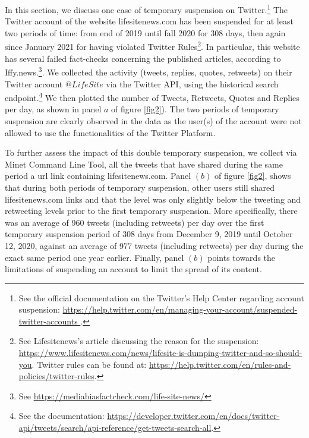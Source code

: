\documentclass[11pt,a4paper]{article}
\begin{document}
In this section, we discuss one case of temporary suspension on Twitter.\footnote{See the official documentation on the Twitter's Help Center regarding account suspension: \href{https://help.twitter.com/en/managing-your-account/suspended-twitter-accounts}{https://help.twitter.com/en/managing-your-account/suspended-twitter-accounts }.} The Twitter account of the website lifesitenews.com has been suspended for at least two periods of time: from end of 2019 until fall 2020 for 308 days, then again since January 2021 for having violated Twitter Rules\footnote{See Lifesitenews's article discussing the reason for the suspension: \href{https://www.lifesitenews.com/news/lifesite-is-dumping-twitter-and-so-should-you}{https://www.lifesitenews.com/news/lifesite-is-dumping-twitter-and-so-should-you}. Twitter rules can be found at: \href{https://help.twitter.com/en/rules-and-policies/twitter-rules}{https://help.twitter.com/en/rules-and-policies/twitter-rules}. }. In particular, this website has several failed fact-checks concerning the published articles, according to Iffy.news.\footnote{See \href{https://mediabiasfactcheck.com/life-site-news/}{https://mediabiasfactcheck.com/life-site-news/}}. We collected the activity (tweets, replies, quotes, retweets) on their Twitter account $@LifeSite$ via the Twitter API, using the historical search endpoint.\footnote{See the documentation: \href{https://developer.twitter.com/en/docs/twitter-api/tweets/search/api-reference/get-tweets-search-all}{https://developer.twitter.com/en/docs/twitter-api/tweets/search/api-reference/get-tweets-search-all}.} We then plotted the number of Tweets, Retweets, Quotes and Replies per day, as shown in panel $a$ of figure \ref{fig2}). The two periods of temporary suspension are clearly observed in the data as the user(s) of the account were not allowed to use the functionalities of the Twitter Platform. 

\smallskip

To further assess the impact of this double temporary suspension, we collect via Minet Command Line Tool\cite{minet}, all the tweets that have shared during the same period a url link containing lifesitenews.com. Panel $(b)$ of figure \ref{fig2}, shows that during both periods of temporary suspension, other users still shared lifesitenews.com links and that the level was only slightly below the tweeting and retweeting levels prior to the first temporary suspension. More specifically, there was an average of 960 tweets (including retweets) per day over the first temporary suspension period of 308 days from December 9, 2019 until October 12, 2020, against an average of 977 tweets (including retweets) per day during the exact same period one year earlier. Finally, panel $(b)$ points towards the limitations of suspending an account to limit the spread of its content. 
\end{document}
